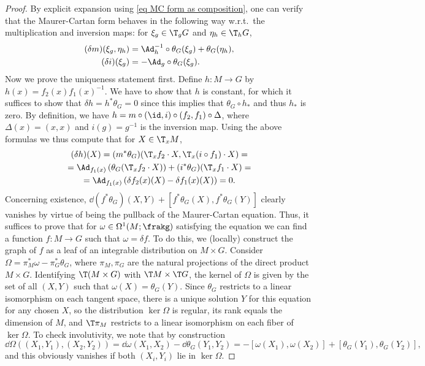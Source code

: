 \begin{proof}
    By explicit expansion using \eqref{eq MC form as composition}, one can verify that the Maurer-Cartan form behaves in the following way w.r.t.\ the multiplication and inversion maps: for $\xi_g\in \T_g G$ and $\eta_h\in \T_hG$,
    \begin{align}
       (\delta m)(\xi_g,\eta_h)&=\Ad_{h}^{-1}\circ \theta_G(\xi_g)+\theta_G(\eta_h),   \label{eq MC form under m}  \\
       (\delta i)(\xi_g)&=-\Ad_g\circ\theta_G(\xi_g). \label{eq MC form under i}
    \end{align}
    Now we prove the uniqueness statement first. Define $h:M\to G$ by $h(x)=f_2(x)f_1(x)^{-1}$. We have to show that $h$ is constant, for which it suffices to show that $\delta h=h^\ast\theta_G=0$ since this implies that $\theta_G\circ h_\ast$ and thus $h_\ast$ is zero. By definition, we have $h=m\circ (\id,i)\circ(f_2,f_1)\circ \Delta$, where $\Delta(x)=(x,x)$ and $i(g)=g^{-1}$ is the inversion map. Using the above formulas we thus compute that for $X\in \T_xM$,
    \begin{multline}
        (\delta h)(X)=(m^\ast \theta_G)(\T_x f_2\cdot X,\T_x(i\circ f_1)\cdot X)=\\
        =\Ad_{f_1(x)}\left(\theta_G(\T_xf_2\cdot X)\right)+(i^\ast\theta_G)(\T_xf_1\cdot X)=\\
        =\Ad_{f_1(x)}\left(\delta f_2(x)(X)-\delta f_1(x)(X)\right)=0.
    \end{multline}
    Concerning existence, $\dd(f^\ast\theta_G)(X,Y)+[f^\ast\theta_G(X),f^\ast\theta_G(Y)]$ clearly vanishes by virtue of being the pullback of the Maurer-Cartan equation. Thus, it suffices to prove that for $\omega\in\Omega^1(M;\frakg)$ satisfying the equation we can find a function $f:M\to G$ such that $\omega=\delta f$. To do this, we (locally) construct the graph of $f$ as a leaf of an integrable distribution on $M\times G$. Consider $\varOmega=\pi^\ast_M\omega-\pi^\ast_G \theta_G$, where $\pi_M,\pi_G$ are the natural projections of the direct product $M\times G$. Identifying $\T(M\times G)$ with $\T M\times \T G$, the kernel of $\varOmega$ is given by the set of all $(X,Y)$ such that $\omega(X)=\theta_G(Y)$. Since $\theta_G$ restricts to a linear isomorphism on each tangent space, there is a unique solution $Y$ for this equation for any chosen $X$, so the distribution $\ker\varOmega$ is regular, its rank equals the dimension of $M$, and $\T\pi_M$ restricts to a linear isomorphism on each fiber of $\ker \varOmega$. To check involutivity, we note that by construction
    \[\dd\varOmega\left((X_1,Y_1),(X_2,Y_2)\right)=\dd\omega(X_1,X_2)-\dd \theta_G(Y_1,Y_2)=-[\omega(X_1),\omega(X_2)]+[\theta_G(Y_1),\theta_G(Y_2)],\]
    and this obviously vanishes if both $(X_i,Y_i)$ lie in $\ker\varOmega$.


\end{proof}
